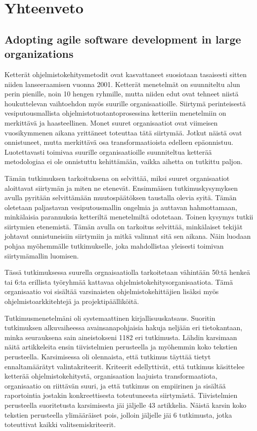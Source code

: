 \documentclass[12pt]{article}
\date{}
\begin{document}
\section*{Yhteenveto}


\subsection*{Adopting agile software development in large organizations}

Ketterät ohjelmistokehitysmetodit ovat kasvattaneet suosiotaan
tasaisesti sitten niiden lanseeraamisen vuonna 2001. Ketterät menetelmät
on suunniteltu alun perin pienille, noin 10 hengen ryhmille, mutta
niiden edut ovat tehneet niistä houkuttelevan vaihtoehdon myös suurille
organisaatioille. Siirtymä perinteisestä vesiputousmallista
ohjelmistotuotantoprosessina ketteriin menetelmiin on merkittävä ja
haasteellinen. Monet suuret organisaatiot ovat viimeisen vuosikymmenen
aikana yrittäneet toteuttaa tätä siirtymää. Jotkut näistä ovat
onnistuneet, mutta merkittävä osa transformaatioista edelleen
epäonnistuu. Luotettavasti toimivaa suurille organisaatioille
suunniteltua ketterää metodologiaa ei ole onnistuttu kehittämään, vaikka
aihetta on tutkittu paljon.

Tämän tutkimuksen tarkoituksena on selvittää, miksi suuret organisaatiot
aloittavat siirtymän ja miten ne etenevät. Ensimmäisen
tutkimuskysymyksen avulla pyritään selvittämään muutospäätöksen
taustalla olevia syitä. Tämän oletetaan paljastavan vesiputousmallin
ongelmia ja auttavan hahmottamaan, minkälaisia parannuksia ketteriltä
menetelmiltä odotetaan. Toinen kysymys tutkii siirtymien etenemistä.
Tämän avulla on tarkoitus selvittää, minkälaiset tekijät johtavat
onnistuneisiin siirtymiin ja mitkä valinnat sitä sen aikana. Näin
luodaan pohjaa myöhemmälle tutkimukselle, joka mahdollistaa yleisesti
toimivan siirtymämallin luomisen.

Tässä tutkimuksessa suurella orgnaisaatiolla tarkoitetaan vähintään
50:tä henkeä tai 6:ta erillista työryhmää kattavaa
ohjelmistokehitysorganisaatiota. Tämä organisaatio voi sisältää
varsinaisten ohjelmistokehittäjien lisäksi myös ohjelmistoarkkitehtejä
ja projektipäälliköitä.

Tutkimusmenetelmäni oli systemaattinen kirjallisuuskatsaus. Suoritin
tutkimuksen alkuvaiheessa avainsanapohjaisia hakuja neljään eri
tietokantaan, minka seurauksena sain aineistokseni 1182 eri tutkimusta.
Lähdin karsimaan näitä artikkeleita ensin tiivistelmien perusteella ja
myöhemmin koko tekstien perusteella. Karsimisessa oli olennaista, että
tutkimus täyttää tietyt ennaltamäärätyt valintakriteerit. Kriteerit
edellyttivät, että tutkimus käsittelee ketterää ohjelmistokehitystä,
organisaation laajuista transformaatiota, organisaatio on riittävän
suuri, ja että tutkimus on empiirinen ja sisältää raportointia jostakin
konkreettisesta toteutuneesta siirtymästä. Tiivistelmien perusteella
suoritetusta karsimisesta jäi jäljelle 43 artikkelia. Näistä karsin koko
tekstien perusteella ylimääräiset pois, jolloin jäljelle jäi 6
tutkimusta, jotka toteuttivat kaikki valitsemiskriteerit.
\end{document}
